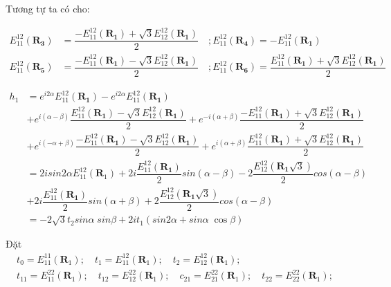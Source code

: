 \documentclass{report}
\begin{document}
Tương tự ta có cho:

\begin{align}
    E_{11}^{12}(\mathbf{R_3}) & =  \dfrac{ -E_{11}^{12}(\mathbf{R_1}) + \sqrt{3} E_{12}^{12}(\mathbf{R_1})}{2} \quad ;  E_{11}^{12}(\mathbf{R_4}) = - E_{11}^{12}(\mathbf{R_1}) \nonumber                                                 \\
    E_{11}^{12}(\mathbf{R_5}) & =  \dfrac{ -E_{11}^{12}(\mathbf{R_1}) - \sqrt{3} E_{12}^{12}(\mathbf{R_1})}{2} \quad ; E_{11}^{12}(\mathbf{R_6})  =  \dfrac{ E_{11}^{12}(\mathbf{R_1}) + \sqrt{3} E_{12}^{12}(\mathbf{R_1})}{2} \nonumber
\end{align}

\begin{align}
    h_1 & = e^{i2\alpha} E_{11}^{12}(\mathbf{R_1}) - e^{i2\alpha} E_{11}^{12}(\mathbf{R_1})   \nonumber                                                                                                                   \\
        & + e^{i(\alpha - \beta)}\dfrac{ E_{11}^{12}(\mathbf{R_1}) - \sqrt{3} E_{12}^{12}(\mathbf{R_1})}{2} + e^{-i(\alpha + \beta)}\dfrac{ -E_{11}^{12}(\mathbf{R_1}) + \sqrt{3} E_{12}^{12}(\mathbf{R_1})}{2} \nonumber \\
        & + e^{i(-\alpha + \beta)} \dfrac{ -E_{11}^{12}(\mathbf{R_1}) - \sqrt{3} E_{12}^{12}(\mathbf{R_1})}{2} + e^{i(\alpha+\beta)}\dfrac{ E_{11}^{12}(\mathbf{R_1}) + \sqrt{3} E_{12}^{12}(\mathbf{R_1})}{2} \nonumber  \\
        & = 2isin2\alpha E_{11}^{12}(\mathbf{R}_1) + 2i \dfrac{E_{11}^{12}(\mathbf{R_1})}{2} sin(\alpha-\beta) - 2\dfrac{E_{12}^{12}(\mathbf{R_1}\sqrt{3})}{2} cos(\alpha - \beta) \nonumber                              \\
        & +  2i \dfrac{E_{11}^{12}(\mathbf{R_1})}{2} sin(\alpha+\beta) + 2\dfrac{E_{12}^{12}(\mathbf{R_1}\sqrt{3})}{2} cos(\alpha - \beta) \nonumber                                                                      \\
        & = -2\sqrt{3} t_2 sin\alpha \; sin\beta + 2i t_1(sin2\alpha + sin\alpha\;\cos\beta) \nonumber
\end{align}


\clearpage

Đặt
\begin{align}
    t_0 = E_{11}^{11}(\mathbf{R}_1); \quad
    t_1 = E_{11}^{12}(\mathbf{R}_1); \quad
    t_2 = E_{12}^{12}(\mathbf{R}_1); \quad \nonumber \\
    t_{11} = E_{11}^{22}(\mathbf{R}_1); \quad
    t_{12} = E_{12}^{22}(\mathbf{R}_1); \quad
    c_{21} = E_{21}^{22}(\mathbf{R}_1); \quad
    t_{22} = E_{22}^{22}(\mathbf{R}_1); \quad \nonumber
\end{align}
\end{document}
